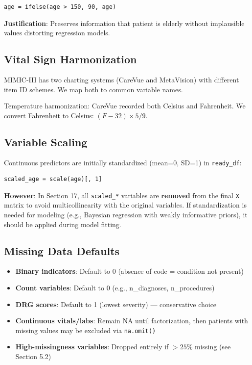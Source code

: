 \documentclass[11pt]{article}
\begin{document}
\begin{verbatim}
age = ifelse(age > 150, 90, age)
\end{verbatim}

\textbf{Justification}: Preserves information that patient is elderly without implausible values distorting regression models.

\subsection{Vital Sign Harmonization}

MIMIC-III has two charting systems (CareVue and MetaVision) with different item ID schemes. We map both to common variable names.

Temperature harmonization: CareVue recorded both Celsius and Fahrenheit. We convert Fahrenheit to Celsius: $(F - 32) \times 5/9$.

\subsection{Variable Scaling}

Continuous predictors are initially standardized (mean=0, SD=1) in \texttt{ready\_df}:

\begin{verbatim}
scaled_age = scale(age)[, 1]
\end{verbatim}

\textbf{However}: In Section 17, all \texttt{scaled\_*} variables are \textbf{removed} from the final \texttt{X} matrix to avoid multicollinearity with the original variables. If standardization is needed for modeling (e.g., Bayesian regression with weakly informative priors), it should be applied during model fitting.

\subsection{Missing Data Defaults}

\begin{itemize}[leftmargin=*, nosep]
    \item \textbf{Binary indicators}: Default to 0 (absence of code = condition not present)
    \item \textbf{Count variables}: Default to 0 (e.g., n\_diagnoses, n\_procedures)
    \item \textbf{DRG scores}: Default to 1 (lowest severity) --- conservative choice
    \item \textbf{Continuous vitals/labs}: Remain NA until factorization, then patients with missing values may be excluded via \texttt{na.omit()}
    \item \textbf{High-missingness variables}: Dropped entirely if $>25\%$ missing (see Section 5.2)
\end{itemize}
\end{document}
